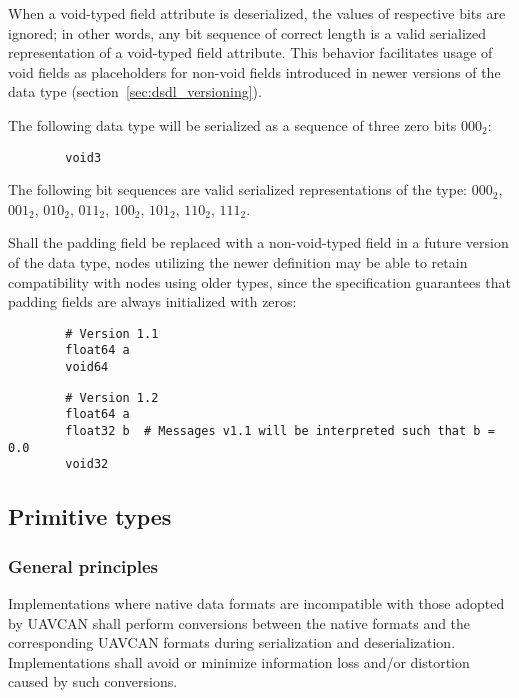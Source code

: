 When a void-typed field attribute is deserialized, the values of respective bits are ignored;
in other words, any bit sequence of correct length is a valid serialized representation
of a void-typed field attribute.
This behavior facilitates usage of void fields as placeholders for non-void fields
introduced in newer versions of the data type (section~\ref{sec:dsdl_versioning}).

\begin{remark}
    The following data type will be serialized as a sequence of three zero bits $000_2$:
    \begin{verbatim}
        void3
    \end{verbatim}
    The following bit sequences are valid serialized representations of the type:
    $000_2$,
    $001_2$,
    $010_2$,
    $011_2$,
    $100_2$,
    $101_2$,
    $110_2$,
    $111_2$.

    Shall the padding field be replaced with a non-void-typed field in a future version of the data type,
    nodes utilizing the newer definition may be able to retain compatibility with nodes using older types,
    since the specification guarantees that padding fields are always initialized with zeros:

    \begin{verbatim}
        # Version 1.1
        float64 a
        void64
    \end{verbatim}

    \begin{verbatim}
        # Version 1.2
        float64 a
        float32 b  # Messages v1.1 will be interpreted such that b = 0.0
        void32
    \end{verbatim}
\end{remark}

\subsection{Primitive types}

\subsubsection{General principles}

Implementations where native data formats are incompatible with those adopted by UAVCAN shall perform
conversions between the native formats and the corresponding UAVCAN formats during
serialization and deserialization.
Implementations shall avoid or minimize information loss and/or distortion caused by such conversions.

